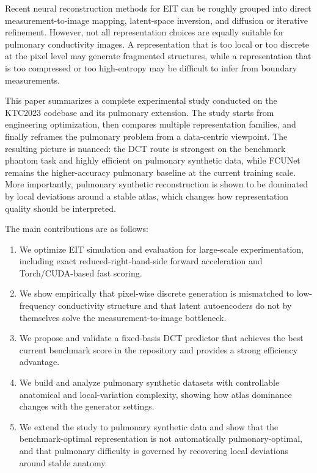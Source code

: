 \documentclass[11pt,a4paper]{article}
\begin{document}
Recent neural reconstruction methods for EIT can be roughly grouped into direct measurement-to-image mapping, latent-space inversion, and diffusion or iterative refinement. However, not all representation choices are equally suitable for pulmonary conductivity images. A representation that is too local or too discrete at the pixel level may generate fragmented structures, while a representation that is too compressed or too high-entropy may be difficult to infer from boundary measurements.

This paper summarizes a complete experimental study conducted on the KTC2023 codebase and its pulmonary extension. The study starts from engineering optimization, then compares multiple representation families, and finally reframes the pulmonary problem from a data-centric viewpoint. The resulting picture is nuanced: the DCT route is strongest on the benchmark phantom task and highly efficient on pulmonary synthetic data, while FCUNet remains the higher-accuracy pulmonary baseline at the current training scale. More importantly, pulmonary synthetic reconstruction is shown to be dominated by local deviations around a stable atlas, which changes how representation quality should be interpreted.

The main contributions are as follows:
\begin{enumerate}[leftmargin=1.5em]
    \item We optimize EIT simulation and evaluation for large-scale experimentation, including exact reduced-right-hand-side forward acceleration and Torch/CUDA-based fast scoring.
    \item We show empirically that pixel-wise discrete generation is mismatched to low-frequency conductivity structure and that latent autoencoders do not by themselves solve the measurement-to-image bottleneck.
    \item We propose and validate a fixed-basis DCT predictor that achieves the best current benchmark score in the repository and provides a strong efficiency advantage.
    \item We build and analyze pulmonary synthetic datasets with controllable anatomical and local-variation complexity, showing how atlas dominance changes with the generator settings.
    \item We extend the study to pulmonary synthetic data and show that the benchmark-optimal representation is not automatically pulmonary-optimal, and that pulmonary difficulty is governed by recovering local deviations around stable anatomy.
\end{enumerate}
\end{document}
